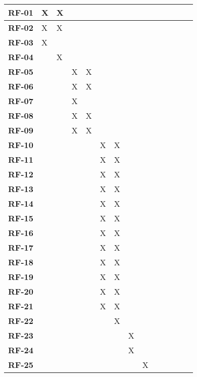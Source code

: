 \begin{center}
\begin{longtable}{ c | p{0.75cm} p{0.75cm} p{0.75cm} p{0.75cm} p{0.75cm} p{0.75cm} p{0.75cm} p{0.75cm} p{0.75cm} p{0.75cm} p{0.75cm} p{0.75cm} p{0.75cm} |}
	\textbf{RF-01} & X & X &  &  &  &  &  &  &  &  &  &  &  \\ \hline
	\textbf{RF-02} & X & X &  &  &  &  &  &  &  &  &  &  &  \\ \hline
	\textbf{RF-03} & X &  &  &  &  &  &  &  &  &  &  &  &  \\ \hline
	\textbf{RF-04} &  & X &  &  &  &  &  &  &  &  &  &  &  \\ \hline
	\textbf{RF-05} &  &  & X & X &  &  &  &  &  &  &  &  &  \\ \hline
	\textbf{RF-06} &  &  & X & X &  &  &  &  &  &  &  &  &  \\ \hline
	\textbf{RF-07} &  &  & X &  &  &  &  &  &  &  &  &  &  \\ \hline
	\textbf{RF-08} &  &  & X & X &  &  &  &  &  &  &  &  &  \\ \hline
	\textbf{RF-09} &  &  & X & X &  &  &  &  &  &  &  &  &  \\ \hline
	\textbf{RF-10} &  &  &  &  & X & X &  &  &  &  &  &  &  \\ \hline
	\textbf{RF-11} &  &  &  &  & X & X &  &  &  &  &  &  &  \\ \hline
	\textbf{RF-12} &  &  &  &  & X & X &  &  &  &  &  &  &  \\ \hline
	\textbf{RF-13} &  &  &  &  & X & X &  &  &  &  &  &  &  \\ \hline
	\textbf{RF-14} &  &  &  &  & X & X &  &  &  &  &  &  &  \\ \hline
	\textbf{RF-15} &  &  &  &  & X & X &  &  &  &  &  &  &  \\ \hline
	\textbf{RF-16} &  &  &  &  & X & X &  &  &  &  &  &  &  \\ \hline
	\textbf{RF-17} &  &  &  &  & X & X &  &  &  &  &  &  &  \\ \hline
	\textbf{RF-18} &  &  &  &  & X & X &  &  &  &  &  &  &  \\ \hline
	\textbf{RF-19} &  &  &  &  & X & X &  &  &  &  &  &  &  \\ \hline
	\textbf{RF-20} &  &  &  &  & X & X &  &  &  &  &  &  &  \\ \hline
	\textbf{RF-21} &  &  &  &  & X & X &  &  &  &  &  &  &  \\ \hline
	\textbf{RF-22} &  &  &  &  &  & X &  &  &  &  &  &  &  \\ \hline
	\textbf{RF-23} &  &  &  &  &  &  & X &  &  &  &  &  &  \\ \hline
	\textbf{RF-24} &  &  &  &  &  &  & X &  &  &  &  &  &  \\ \hline
	\textbf{RF-25} &  &  &  &  &  &  &  & X &  &  &  &  &  \\ \hline

\end{longtable}
\end{center}
